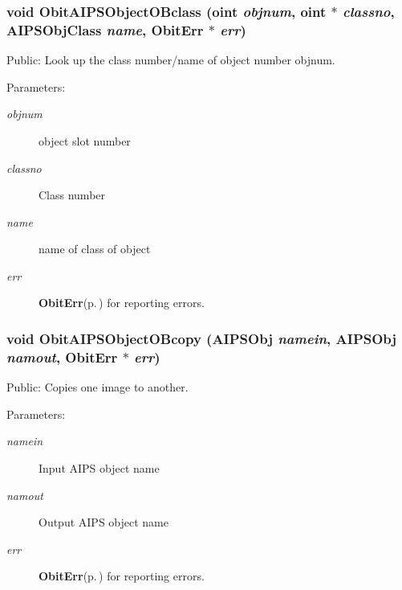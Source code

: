 \subsubsection{\setlength{\rightskip}{0pt plus 5cm}void Obit\-AIPSObject\-OBclass ({\bf oint} {\em objnum}, {\bf oint} $\ast$ {\em classno}, {\bf AIPSObj\-Class} {\em name}, {\bf Obit\-Err} $\ast$ {\em err})}\label{ObitAIPSObject_8h_a17}


Public: Look up the class number/name of object number objnum. 

\begin{Desc}
\item[Parameters:]
\begin{description}
\item[{\em objnum}]object slot number \item[{\em classno}]Class number \item[{\em name}]name of class of object \item[{\em err}]{\bf Obit\-Err}{\rm (p.\,\pageref{structObitErr})} for reporting errors. \end{description}
\end{Desc}
\subsubsection{\setlength{\rightskip}{0pt plus 5cm}void Obit\-AIPSObject\-OBcopy ({\bf AIPSObj} {\em namein}, {\bf AIPSObj} {\em namout}, {\bf Obit\-Err} $\ast$ {\em err})}\label{ObitAIPSObject_8h_a24}


Public: Copies one image to another. 

\begin{Desc}
\item[Parameters:]
\begin{description}
\item[{\em namein}]Input AIPS object name \item[{\em namout}]Output AIPS object name \item[{\em err}]{\bf Obit\-Err}{\rm (p.\,\pageref{structObitErr})} for reporting errors. \end{description}
\end{Desc}
